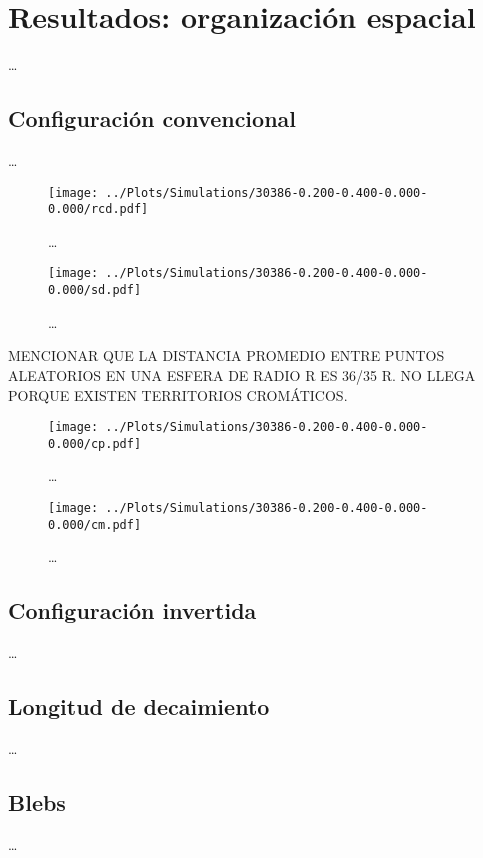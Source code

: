 \chapter{Resultados: organización espacial}
\label{cap:results}

\dots

\section{Configuración convencional}

\dots

\begin{figure}
  \centering
  \texttt{[image: ../Plots/Simulations/30386-0.200-0.400-0.000-0.000/rcd.pdf]}
  \caption{\dots}
  \label{fig:rcd}
\end{figure}

\begin{figure}
  \centering
  \texttt{[image: ../Plots/Simulations/30386-0.200-0.400-0.000-0.000/sd.pdf]}
  \caption{\dots}
  \label{fig:sd}
\end{figure}

MENCIONAR QUE LA DISTANCIA PROMEDIO ENTRE PUNTOS ALEATORIOS EN UNA ESFERA DE RADIO R ES 36/35 R. NO LLEGA PORQUE EXISTEN TERRITORIOS CROMÁTICOS.

\begin{figure}
  \centering
  \texttt{[image: ../Plots/Simulations/30386-0.200-0.400-0.000-0.000/cp.pdf]}
  \caption{\dots}
  \label{fig:cp}
\end{figure}

\begin{figure}
  \centering
  \texttt{[image: ../Plots/Simulations/30386-0.200-0.400-0.000-0.000/cm.pdf]}
  \caption{\dots}
  \label{fig:cm}
\end{figure}

\section{Configuración invertida}

\dots

\section{Longitud de decaimiento}

\dots

\section{Blebs}

\dots
